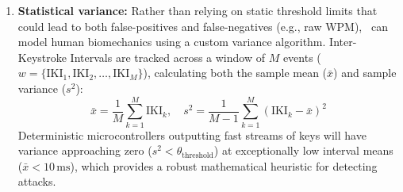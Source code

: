 \begin{enumerate}
	\item \textbf{Statistical variance:} Rather than relying on static threshold limits that could lead to both false-positives and false-negatives (e.g., raw WPM), \projectNameFormatted\ can model human biomechanics using a custom variance algorithm. Inter-Keystroke Intervals are tracked across a window of $M$ events ($w = \{\text{IKI}_1, \text{IKI}_2, \dots, \text{IKI}_M\}$), calculating both the sample mean ($\bar{x}$) and sample variance ($s^2$):
	      \begin{equation}
		      \label{eq:2_1_equation}
		      \bar{x} = \frac{1}{M}\sum_{k=1}^{M} \text{IKI}_k, \quad s^2 = \frac{1}{M-1}\sum_{k=1}^{M} (\text{IKI}_k - \bar{x})^2
	      \end{equation}
	      Deterministic microcontrollers outputting fast streams of keys will have variance approaching zero ($s^2 < \theta_{\text{threshold}}$) at exceptionally low interval means ($\bar{x} < 10\,\text{ms}$), which provides a robust mathematical heuristic for detecting attacks.
\end{enumerate}

